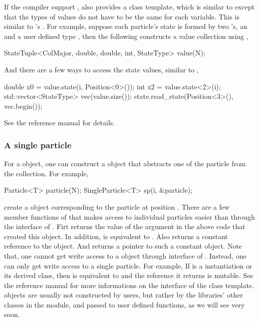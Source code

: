 If the compiler support \cppoo{} , \vsmc also provides a
 class template, which is similar to 
except that the types of values do not have to be the same for each variable.
This is similar to \rlang's . For example, suppose each
particle's state is formed by two 's, an  and a user
defined type , then the following constructs a value
collection using ,
\begin{cppcode}
StateTuple<ColMajor, double, double, int, StateType> value(N);
\end{cppcode}
And there are a few ways to access the state values, similar to
,
\begin{cppcode}
double x0 = value.state(i, Position<0>());
int x2 = value.state<2>(i);
std::vector<StateType> vec(value.size());
state.read_state(Position<3>(), vec.begin());
\end{cppcode}
See the reference manual for details.

\subsubsection{A single particle}

For a  object, one can construct a 
object that abstracts one of the particle from the collection. For example,
\begin{cppcode}
Particle<T> particle(N);
SingleParticle<T> sp(i, &particle);
\end{cppcode}
create a  object corresponding to the particle at
position . There are a few member functions of
 that makes access to individual particles easier than
through the interface of . Firt  returns the
value of the argument  in the above code that created this
 object. In addition,  is equivalent to
. Also  returns a constant reference
to the  object. And  returns a
pointer to such a constant  object. Note that, one cannot
get write access to a  object through interface of
. Instead, one can only get write access to a single
particle. For example, If  is a  instantiation or
its derived class, then  is equivalent to
 and the reference it returns is mutable.
See the reference manual for more informations on the interface of the
 class template.  objects are
usually not constructed by users, but rather by the libraries' other classes
in the \smp module, and passed to user defined functions, as we will see very
soon.

